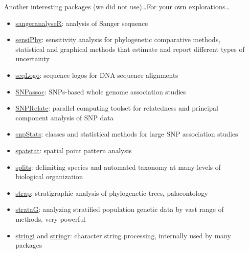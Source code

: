 \documentclass[compress, xelatex, 11pt, xcolor=svgnames, aspectratio=169, url={hyphens, lowtilde}]{beamer}
\begin{document}
\begin{frame}[allowframebreaks]{Another interesting packages (we did not use)\ldots}{For your own explorations\ldots}
\begin{itemize}
		\item \href{https://bioconductor.org/packages/release/bioc/html/sangeranalyseR.html}{sangeranalyseR}: analysis of Sanger sequence
		\item \href{https://CRAN.R-project.org/package=sensiPhy}{sensiPhy}: sensitivity analysis for phylogenetic comparative methods,  statistical and graphical methods that estimate and report different types of uncertainty
		\item \href{https://www.bioconductor.org/packages/release/bioc/html/seqLogo.html}{seqLogo}: sequence logos for DNA sequence alignments
		\item \href{https://CRAN.R-project.org/package=SNPassoc}{SNPassoc}: SNPs-based whole genome association studies
		\item \href{https://www.bioconductor.org/packages/release/bioc/html/SNPRelate.html}{SNPRelate}: parallel computing toolset for relatedness and principal component analysis of SNP data
		\item \href{https://bioconductor.org/packages/release/bioc/html/snpStats.html}{snpStats}: classes and statistical methods for large SNP association studies
		\item \href{https://CRAN.R-project.org/package=spatstat}{spatstat}: spatial point pattern analysis
		\item \href{https://r-forge.r-project.org/projects/splits/}{splits}: delimiting species and automated taxonomy at many levels of biological organization
		\item \href{https://CRAN.R-project.org/package=strap}{strap}: stratigraphic analysis of phylogenetic trees, palaeontology
		\item \href{https://github.com/cran/strataG}{strataG}: analyzing stratified population genetic data by vast range of methods, very powerful
		\item \href{https://CRAN.R-project.org/package=stringi}{stringi} and \href{https://CRAN.R-project.org/package=stringr}{stringr}: character string processing, internally used by many packages

\end{itemize}
\end{frame}
\end{document}
